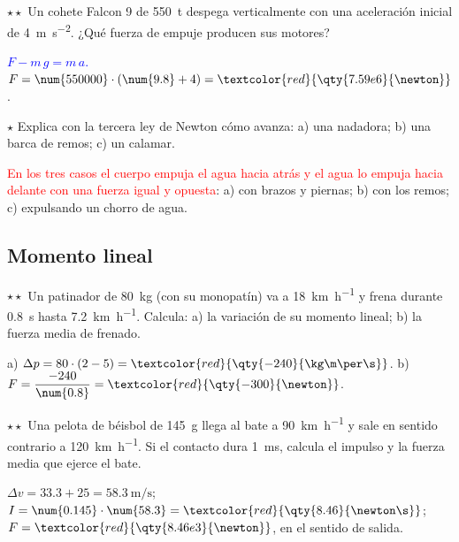 \begin{exercise}
    \(\star\star\) Un cohete Falcon 9 de \qty{550}{t} despega verticalmente con una aceleración inicial de \qty{4}{\m\per\s\squared}.
    ¿Qué fuerza de empuje producen sus motores?
    \begin{solu}
        \textcolor{blue}{\(F - m\,g = m\,a\).} \(F = \num{550000} \cdot (\num{9.8} + 4) = \textcolor{red}{\qty{7.59e6}{\newton}}\).
    \end{solu}
\end{exercise}

\begin{exercise}
    \(\star\) Explica con la tercera ley de Newton cómo avanza: a) una nadadora; b) una barca de remos; c) un calamar.
    \begin{solu}
        \textcolor{red}{En los tres casos el cuerpo empuja el agua hacia atrás y el agua lo empuja hacia delante con una fuerza igual
        y opuesta}: a) con brazos y piernas; b) con los remos; c) expulsando un chorro de agua.
    \end{solu}
\end{exercise}

\subsection{Momento lineal}

\begin{exercise}
    \(\star\star\) Un patinador de \qty{80}{\kg} (con su monopatín) va a \qty{18}{\km\per\hour} y frena durante \qty{0.8}{\s} hasta
    \qty{7.2}{\km\per\hour}. Calcula: a) la variación de su momento lineal; b) la fuerza media de frenado.
    \begin{solu}
        a) \(\Delta p = 80 \cdot (2 - 5) = \textcolor{red}{\qty{-240}{\kg\m\per\s}}\). b) \(F = \dfrac{-240}{\num{0.8}} =
        \textcolor{red}{\qty{-300}{\newton}}\).
    \end{solu}
\end{exercise}

\begin{exercise}
    \(\star\star\) Una pelota de béisbol de \qty{145}{\g} llega al bate a \qty{90}{\km\per\hour} y sale en sentido contrario a
    \qty{120}{\km\per\hour}. Si el contacto dura \qty{1}{\milli\s}, calcula el impulso y la fuerza media que ejerce el bate.
    \begin{solu}
        \(\Delta v = \num{33.3} + 25 = \qty{58.3}{\m\per\s}\); \(I = \num{0.145} \cdot \num{58.3} = \textcolor{red}{\qty{8.46}{\newton\s}}\);
        \(F = \textcolor{red}{\qty{8.46e3}{\newton}}\), en el sentido de salida.
    \end{solu}
\end{exercise}

